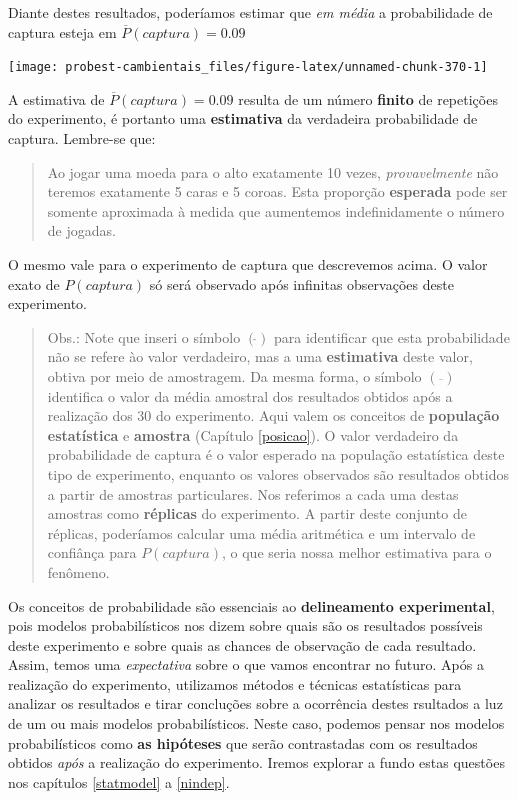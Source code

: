 \documentclass[
]{book}
\begin{document}
Diante destes resultados, poderíamos estimar que \emph{em média} a probabilidade de captura esteja em \(\overline{P}(captura) = 0.09\)

\begin{center}\texttt{[image: probest-cambientais\_files/figure-latex/unnamed-chunk-370-1]} \end{center}

A estimativa de \(\overline{P}(captura) = 0.09\) resulta de um número \textbf{finito} de repetições do experimento, é portanto uma \textbf{estimativa} da verdadeira probabilidade de captura. Lembre-se que:

\begin{quote}
Ao jogar uma moeda para o alto exatamente 10 vezes, \emph{provavelmente} não teremos exatamente 5 caras e 5 coroas. Esta proporção \textbf{esperada} pode ser somente aproximada à medida que aumentemos indefinidamente o número de jogadas.
\end{quote}

O mesmo vale para o experimento de captura que descrevemos acima. O valor exato de \(P(captura)\) só será observado após infinitas observações deste experimento.

\begin{quote}
Obs.: Note que inseri o símbolo \((\hat{})\) para identificar que esta probabilidade não se refere ào valor verdadeiro, mas a uma \textbf{estimativa} deste valor, obtiva por meio de amostragem. Da mesma forma, o símbolo \((\overline{})\) identifica o valor da média amostral dos resultados obtidos após a realização dos 30 do experimento. Aqui valem os conceitos de \textbf{população estatística} e \textbf{amostra} (Capítulo \ref{posicao}). O valor verdadeiro da probabilidade de captura é o valor esperado na população estatística deste tipo de experimento, enquanto os valores observados são resultados obtidos a partir de amostras particulares. Nos referimos a cada uma destas amostras como \textbf{réplicas} do experimento. A partir deste conjunto de réplicas, poderíamos calcular uma média aritmética e um intervalo de confiânça para \(P(captura)\), o que seria nossa melhor estimativa para o fenômeno.
\end{quote}

Os conceitos de probabilidade são essenciais ao \textbf{delineamento experimental}, pois modelos probabilísticos nos dizem sobre quais são os resultados possíveis deste experimento e sobre quais as chances de observação de cada resultado. Assim, temos uma \emph{expectativa} sobre o que vamos encontrar no futuro. Após a realização do experimento, utilizamos métodos e técnicas estatísticas para analizar os resultados e tirar concluções sobre a ocorrência destes rsultados a luz de um ou mais modelos probabilísticos. Neste caso, podemos pensar nos modelos probabilísticos como \textbf{as hipóteses} que serão contrastadas com os resultados obtidos \emph{após} a realização do experimento. Iremos explorar a fundo estas questões nos capítulos \ref{statmodel} a \ref{nindep}.
\end{document}
